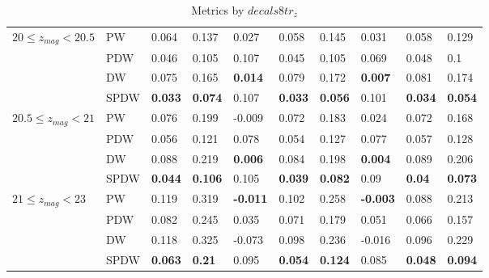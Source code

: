\documentclass[fleqn,usenatbib]{mnras}
\begin{document}
\begin{table}
\begin{tabular}{llllllllll}
\hline
            $20 \leq z_{mag} < 20.5$ & PW &                0.064 &           0.137 &            0.027 &            0.058 &           0.145 &            0.031 &            0.058 &           0.129 \\
                                   & PDW &                0.046 &           0.105 &            0.107 &            0.045 &           0.105 &            0.069 &            0.048 &             0.1 \\
                                   & DW &                0.075 &           0.165 &   \textbf{0.014} &            0.079 &           0.172 &   \textbf{0.007} &            0.081 &           0.174 \\
                                   & SPDW &       \textbf{0.033} &  \textbf{0.074} &            0.107 &   \textbf{0.033} &  \textbf{0.056} &            0.101 &   \textbf{0.034} &  \textbf{0.054} \\
\hline
            $20.5 \leq z_{mag} < 21$ & PW &                0.076 &           0.199 &           -0.009 &            0.072 &           0.183 &            0.024 &            0.072 &           0.168 \\
                                   & PDW &                0.056 &           0.121 &            0.078 &            0.054 &           0.127 &            0.077 &            0.057 &           0.128 \\
                                   & DW &                0.088 &           0.219 &   \textbf{0.006} &            0.084 &           0.198 &   \textbf{0.004} &            0.089 &           0.206 \\
                                   & SPDW &       \textbf{0.044} &  \textbf{0.106} &            0.105 &   \textbf{0.039} &  \textbf{0.082} &             0.09 &    \textbf{0.04} &  \textbf{0.073} \\
\hline
            $21 \leq z_{mag} < 23$ & PW &                0.119 &           0.319 &  \textbf{-0.011} &            0.102 &           0.258 &  \textbf{-0.003} &            0.088 &           0.213 \\
                                   & PDW &                0.082 &           0.245 &            0.035 &            0.071 &           0.179 &            0.051 &            0.066 &           0.157 \\
                                   & DW &                0.118 &           0.325 &           -0.073 &            0.098 &           0.236 &           -0.016 &            0.096 &           0.229 \\
                                   & SPDW &       \textbf{0.063} &   \textbf{0.21} &            0.095 &   \textbf{0.054} &  \textbf{0.124} &            0.085 &   \textbf{0.048} &  \textbf{0.094} \\
\hline
            \hline
            \end{tabular}
            \caption{Metrics by $decals8tr_z$}
\end{table}
\end{document}
